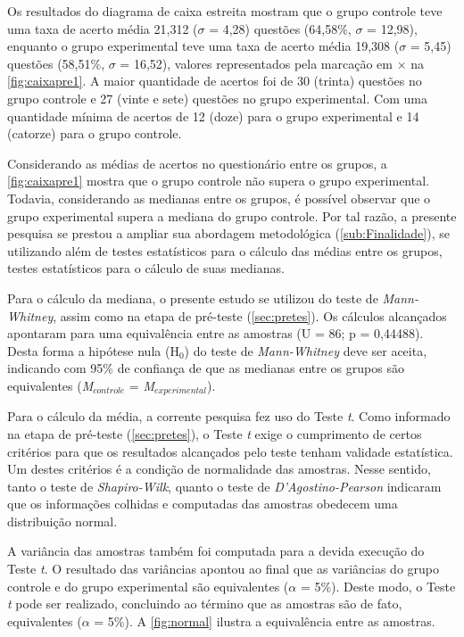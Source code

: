 Os resultados do diagrama de caixa estreita mostram que o grupo controle teve uma taxa de acerto média 21,312 ($\sigma$ = 4,28) questões (64,58\%, $\sigma$ = 12,98), enquanto o grupo experimental teve uma taxa de acerto média 19,308 ($\sigma$ = 5,45) questões (58,51\%, $\sigma$ = 16,52), valores representados pela marcação em $\times$ na \autoref{fig:caixapre1}. A maior quantidade de acertos foi de 30 (trinta) questões no grupo controle e 27 (vinte e sete) questões no grupo experimental. Com uma quantidade mínima de acertos de 12 (doze) para o grupo experimental e 14 (catorze) para o grupo controle.

Considerando as médias de acertos no questionário entre os grupos, a \autoref{fig:caixapre1} mostra que o grupo controle não supera o grupo experimental. Todavia, considerando as medianas entre os grupos, é possível observar que o grupo experimental supera a mediana do grupo controle. Por tal razão, a presente pesquisa se prestou a ampliar sua abordagem metodológica (\autoref{sub:Finalidade}), se utilizando além de testes estatísticos para o cálculo das médias entre os grupos, testes estatísticos para o cálculo de suas medianas. 

Para o cálculo da mediana, o presente estudo se utilizou do teste de \textit{Mann-Whitney}, assim como na etapa de pré-teste (\autoref{sec:pretes}). Os cálculos alcançados apontaram para uma equivalência entre as amostras (U = 86; p = 0,44488). Desta forma a hipótese nula (H$_0$) do teste de \textit{Mann-Whitney} deve ser aceita, indicando com 95\% de confiança de que as medianas entre os grupos são equivalentes (\textit{M}$_{controle}$ = \textit{M}$_{experimental}$). 

Para o cálculo da média, a corrente pesquisa fez uso do Teste \textit{t}. Como informado na etapa de pré-teste (\autoref{sec:pretes}), o Teste \textit{t} exige o cumprimento de certos critérios para que os resultados alcançados pelo teste tenham validade estatística. Um destes critérios é a condição de normalidade das amostras. Nesse sentido, tanto o teste de \textit{Shapiro-Wilk}, quanto o teste de \textit{D'Agostino-Pearson} indicaram que os informações colhidas e computadas das amostras obedecem uma distribuição normal. 

A variância das amostras também foi computada para a devida execução do Teste \textit{t}. O resultado das variâncias apontou ao final que as variâncias do grupo controle e do grupo experimental são equivalentes ($\alpha$ = 5\%). Deste modo, o Teste \textit{t} pode ser realizado, concluindo ao término que as amostras são de fato, equivalentes ($\alpha$ = 5\%). A \autoref{fig:normal} ilustra a equivalência entre as amostras.

